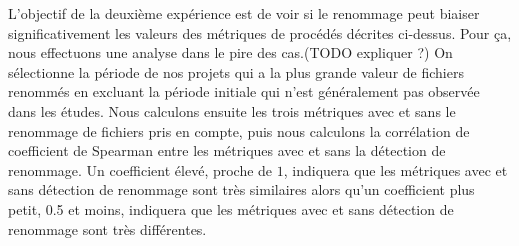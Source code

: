 L'objectif de la deuxième expérience est de voir si le renommage peut biaiser significativement les valeurs des métriques de procédés décrites ci-dessus. Pour ça, nous effectuons une analyse dans le pire des cas.(TODO expliquer ?) On sélectionne la période de nos projets qui a la plus grande valeur de fichiers renommés en excluant la période initiale qui n'est généralement pas observée dans les études. Nous calculons ensuite les trois métriques avec et sans le renommage de fichiers pris en compte, puis nous calculons la corrélation de coefficient de Spearman entre les métriques avec et sans la détection de renommage. Un coefficient élevé, proche de $1$, indiquera que les métriques avec et sans détection de renommage sont très similaires alors qu'un coefficient plus petit, 0.5 et moins, indiquera que les métriques avec et sans détection de renommage sont très différentes.\\ 
